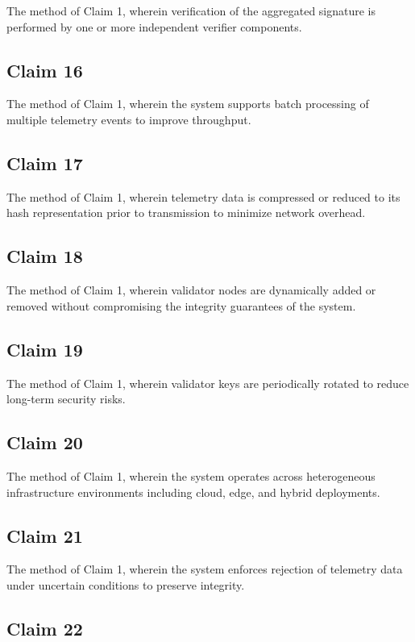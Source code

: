 The method of Claim 1, wherein verification of the aggregated signature is performed by one or more independent verifier components.

\subsection{Claim 16}

The method of Claim 1, wherein the system supports batch processing of multiple telemetry events to improve throughput.

\subsection{Claim 17}

The method of Claim 1, wherein telemetry data is compressed or reduced to its hash representation prior to transmission to minimize network overhead.

\subsection{Claim 18}

The method of Claim 1, wherein validator nodes are dynamically added or removed without compromising the integrity guarantees of the system.

\subsection{Claim 19}

The method of Claim 1, wherein validator keys are periodically rotated to reduce long-term security risks.

\subsection{Claim 20}

The method of Claim 1, wherein the system operates across heterogeneous infrastructure environments including cloud, edge, and hybrid deployments.

\subsection{Claim 21}

The method of Claim 1, wherein the system enforces rejection of telemetry data under uncertain conditions to preserve integrity.

\subsection{Claim 22}

